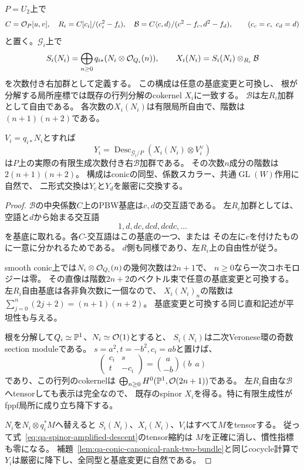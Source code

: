 \begin{lemma}
\label{lem:qa-intrinsic-spinor-induced-module}
$P=U_2$上で
\[
 C=\mathcal O_P[u,v],\quad
 R_i=C[c_i]/(c_i^2-f_i),\quad
 \mathcal B=C\langle c,d\rangle/(c^2-f_c,d^2-f_d),
 \qquad (c_c=c,\ c_d=d)
\]
と置く。$\mathscr G_i$上で
\[
 S_i(N_i)=\bigoplus_{n\ge0}
      q_{i*}(N_i\otimes\mathcal O_{Q_i}(n)),\qquad
 X_i(N_i)=S_i(N_i)\otimes_{R_i}\mathcal B
\]
を次数付き右加群として定義する。
この構成は任意の基底変更と可換し、
根が分解する局所座標では既存の行列分解のcokernel $X_i$に一致する。
$\mathcal B$は左$R_i$加群として自由である。
各次数の$X_i(N_i)$は有限局所自由で、階数は$(n+1)(n+2)$である。

$V_i=q_{i*}N_i$とすれば
\begin{equation}
 Y_i=\operatorname{Desc}_{\mathscr G_i/P}
                  (X_i(N_i)\otimes V_i^\vee)
 \label{eq:qa-spinor-amplified-descent}
\end{equation}
は$P$上の実際の有限生成次数付き右$\mathcal B$加群である。
その次数$n$成分の階数は$2(n+1)(n+2)$。
構成はconicの同型、係数スカラー、共通$\operatorname{GL}(W)$作用に自然で、
二形式交換は$Y_c$と$Y_d$を厳密に交換する。
\end{lemma}
\begin{proof}
$\mathcal B$の中央係数$C$上のPBW基底は$c,d$の交互語である。
左$R_c$加群としては、空語と$d$から始まる交互語
\[
 1,d,dc,dcd,dcdc,\ldots
\]
を基底に取れる。各$C$-交互語はこの基底の一つ、または
その左に$c$を付けたものに一意に分かれるためである。
$d$側も同様であり、左$R_i$上の自由性が従う。

smooth conic上では$N_i\otimes\mathcal O_{Q_i}(n)$の幾何次数は$2n+1$で、
$n\ge0$なら一次コホモロジーは零。
その直像は階数$2n+2$のベクトル束で任意の基底変更と可換する。
左$R_i$自由基底は各非負次数に一個なので、
$X_i(N_i)_n$の階数は
$\sum_{j=0}^n(2j+2)=(n+1)(n+2)$。
基底変更と可換する同じ直和記述が平坦性も与える。

根を分解して$Q_i\simeq\mathbb P^1$、$N_i\simeq\mathcal O(1)$とすると、
$S_i(N_i)$は二次Veronese環の奇数section moduleである。
$s=a^2,t=-b^2,c_i=ab$と置けば、
\[
 \begin{pmatrix}c_i&s\\t&-c_i\end{pmatrix}
  =\binom{a}{-b}(b\ \ a)
\]
であり、この行列のcokernelは
$\bigoplus_{n\ge0}H^0(\mathbb P^1,\mathcal O(2n+1))$である。
左$R_i$自由な$\mathcal B$へtensorしても表示は完全なので、
既存のspinor $X_i$を得る。特に有限生成性がfppf局所に成り立ち降下する。

$N_i$を$N_i\otimes q_i^*M$へ替えると
$S_i(N_i)$、$X_i(N_i)$、$V_i$はすべて$M$をtensorする。
従って式~\eqref{eq:qa-spinor-amplified-descent}のtensor縮約は
$M$を正確に消し、慣性指標も零になる。
補題~\ref{lem:qa-conic-canonical-rank-two-bundle}と同じcocycle計算で
$Y_i$は厳密に降下し、全同型と基底変更に自然である。
\end{proof}

